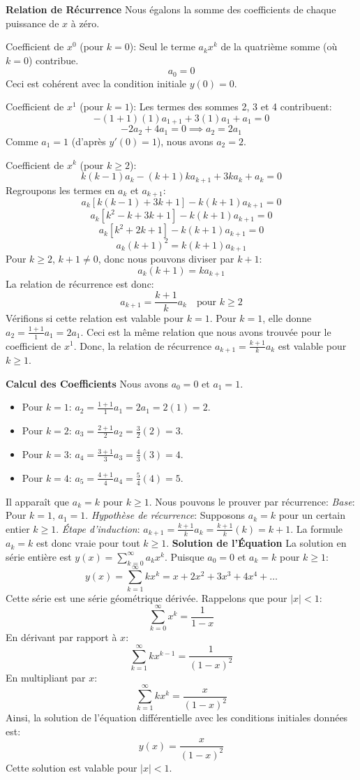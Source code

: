 {{\textbf{Relation de Récurrence}
Nous égalons la somme des coefficients de chaque puissance de $x$ à zéro.

Coefficient de $x^0$ (pour $k=0$):
Seul le terme $a_k x^k$ de la quatrième somme (où $k=0$) contribue.
$$a_0 = 0$$
Ceci est cohérent avec la condition initiale $y(0)=0$.

Coefficient de $x^1$ (pour $k=1$):
Les termes des sommes 2, 3 et 4 contribuent:
$$-(1+1)(1)a_{1+1} + 3(1)a_1 + a_1 = 0$$
$$-2a_2 + 4a_1 = 0 \implies a_2 = 2a_1$$
Comme $a_1=1$ (d'après $y'(0)=1$), nous avons $a_2=2$.

Coefficient de $x^k$ (pour $k \ge 2$):
$$k(k-1)a_k - (k+1)k a_{k+1} + 3k a_k + a_k = 0$$
Regroupons les termes en $a_k$ et $a_{k+1}$:
$$a_k [k(k-1) + 3k + 1] - k(k+1)a_{k+1} = 0$$
$$a_k [k^2-k+3k+1] - k(k+1)a_{k+1} = 0$$
$$a_k [k^2+2k+1] - k(k+1)a_{k+1} = 0$$
$$a_k (k+1)^2 = k(k+1)a_{k+1}$$
Pour $k \ge 2$, $k+1 \neq 0$, donc nous pouvons diviser par $k+1$:
$$a_k (k+1) = k a_{k+1}$$
La relation de récurrence est donc:
$$a_{k+1} = \frac{k+1}{k} a_k \quad \text{pour } k \ge 2$$
Vérifions si cette relation est valable pour $k=1$. Pour $k=1$, elle donne $a_2 = \frac{1+1}{1} a_1 = 2a_1$. Ceci est la même relation que nous avons trouvée pour le coefficient de $x^1$.
Donc, la relation de récurrence $a_{k+1} = \frac{k+1}{k} a_k$ est valable pour $k \ge 1$.

\textbf{Calcul des Coefficients}
Nous avons $a_0=0$ et $a_1=1$.
\begin{itemize}
    \item Pour $k=1$: $a_2 = \frac{1+1}{1} a_1 = 2a_1 = 2(1) = 2$.
    \item Pour $k=2$: $a_3 = \frac{2+1}{2} a_2 = \frac{3}{2}(2) = 3$.
    \item Pour $k=3$: $a_4 = \frac{3+1}{3} a_3 = \frac{4}{3}(3) = 4$.
    \item Pour $k=4$: $a_5 = \frac{4+1}{4} a_4 = \frac{5}{4}(4) = 5$.
\end{itemize}
Il apparaît que $a_k = k$ pour $k \ge 1$. Nous pouvons le prouver par récurrence:
\textit{Base}: Pour $k=1$, $a_1=1$.
\textit{Hypothèse de récurrence}: Supposons $a_k=k$ pour un certain entier $k \ge 1$.
\textit{Étape d'induction}: $a_{k+1} = \frac{k+1}{k} a_k = \frac{k+1}{k} (k) = k+1$.
La formule $a_k=k$ est donc vraie pour tout $k \ge 1$.
\newpage
\textbf{Solution de l'Équation}
La solution en série entière est $y(x) = \sum_{k=0}^{\infty} a_k x^k$.
Puisque $a_0=0$ et $a_k=k$ pour $k \ge 1$:
$$y(x) = \sum_{k=1}^{\infty} k x^k = x + 2x^2 + 3x^3 + 4x^4 + \dots$$
Cette série est une série géométrique dérivée. Rappelons que pour $|x|<1$:
$$\sum_{k=0}^{\infty} x^k = \frac{1}{1-x}$$
En dérivant par rapport à $x$:
$$\sum_{k=1}^{\infty} k x^{k-1} = \frac{1}{(1-x)^2}$$
En multipliant par $x$:
$$\sum_{k=1}^{\infty} k x^k = \frac{x}{(1-x)^2}$$
Ainsi, la solution de l'équation différentielle avec les conditions initiales données est:
$$y(x) = \frac{x}{(1-x)^2}$$
Cette solution est valable pour $|x|<1$.
}
}














